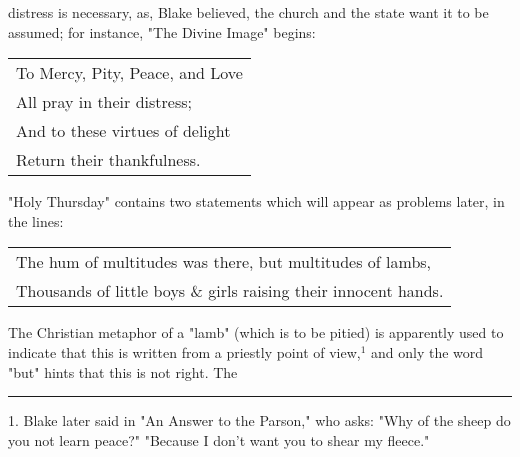 distress is necessary, as, Blake believed, the church and the state want it to be assumed; for instance, "The Divine Image" begins:\par
\begin{center}
	\parbox{0.8\textwidth}{
		\centering
		\begin{tabular}{l}
			To Mercy, Pity, Peace, and Love \\
			All pray in their distress;     \\
			And to these virtues of delight \\
			Return their thankfulness.
		\end{tabular}
	}%
\end{center}
"Holy Thursday" contains two statements which will appear as problems later, in the lines:\par
\begin{center}
	\begin{tabular}{l}
		The hum of multitudes was there, but multitudes of lambs, \\
		Thousands of little boys \& girls raising their innocent hands.
	\end{tabular}
\end{center}
The Christian metaphor of a "lamb" (which is to be pitied) is apparently used
to indicate that this is written from a priestly point of view,$^{1}$ and only the word "but" hints that this is not right. The\linebreak
\null\par
\vspace*{-\baselineskip}
\vspace*{\fill}
\noindent\rule{0.25\textwidth}{0.4pt}\par
1. Blake later said in "An Answer to the Parson," who asks: "Why of the sheep do you not learn peace?" "Because I don't want
you to shear my fleece."\par

\newpage

